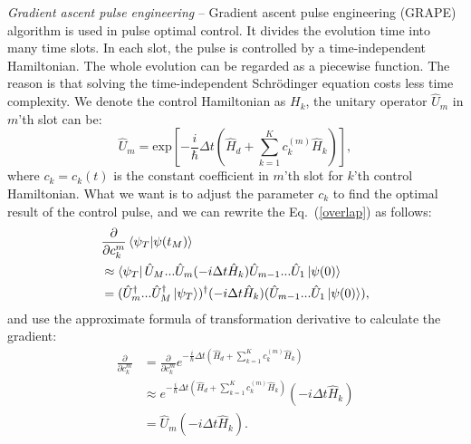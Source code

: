 \textit{Gradient ascent pulse engineering} -- Gradient ascent pulse engineering (GRAPE) algorithm is used in pulse optimal control. It divides the evolution time into many time slots. In each slot, the pulse is controlled by a time-independent Hamiltonian. The whole evolution can be regarded as a piecewise function. The reason is that solving the time-independent Schrödinger equation costs less time complexity. We denote the control Hamiltonian as $H_{k}$, the unitary operator $\hat{U}_{m}$ in $m$'th slot can be:
\begin{equation}
    \hat{U}_{m}=\mathrm{exp}\left[-\frac{i}{\hbar}\Delta t\left(\hat{H}_{d}+\sum_{k=1}^{K}c_{k}^{(m)}\hat{H}_{k}\right)\right],
\end{equation}
where $c_{k}=c_{k}(t)$ is the constant coefficient in $m$'th slot for $k$'th control Hamiltonian. What we want is to adjust the parameter $c_{k}$ to find the optimal result of the control pulse, and we can rewrite the Eq.~(\ref{overlap}) as follows:
\begin{equation}
    \begin{aligned}
         & \frac{\partial}{\partial c_{k}^{m}}\braket{\psi_{T}|\psi(t_M)}                                                                             \\
         & \approx\bra{\psi_{T}}\hat{U}_{M}...\hat{U}_{m}(-i\Delta t\hat{H}_{k})\hat{U}_{m-1}...\hat{U}_{1}\ket{\psi(0)}                              \\
         & =(\hat{U}_{m}^{\dagger}...\hat{U}_{M}^{\dagger}\ket{\psi_{T}})^{\dagger}(-i\Delta t\hat{H}_{k})(\hat{U}_{m-1}...\hat{U}_{1}\ket{\psi(0)}),
    \end{aligned}
\end{equation}
and use the approximate formula of transformation derivative to calculate the gradient:
\begin{equation}
    \begin{aligned}
        \frac{\partial}{\partial c_{k}^{m}} & =\frac{\partial}{\partial c_{k}^{m}}e^{-\frac{i}{\hbar}\Delta t\left(\hat{H}_{d}+\sum_{k=1}^{K}c_{k}^{(m)}\hat{H}_{k}\right)} \\
                                            & \approx e^{-\frac{i}{\hbar}\Delta t\left(\hat{H}_{d}+\sum_{k=1}^{K}c_{k}^{(m)}\hat{H}_{k}\right)}(-i\Delta t\hat{H}_{k})      \\
                                            & =\hat{U}_{m}(-i\Delta t\hat{H}_{k}).
    \end{aligned}
\end{equation}
